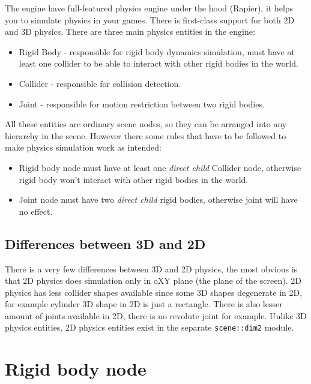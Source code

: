 \documentclass[
]{book}
\providecommand{\tightlist}{%
  \setlength{\itemsep}{0pt}\setlength{\parskip}{0pt}}
\theoremstyle{definition}
\theoremstyle{definition}
\theoremstyle{definition}
\theoremstyle{definition}
\theoremstyle{remark}
\begin{document}
The engine have full-featured physics engine under the hood (Rapier), it helps you to simulate physics in your games.
There is first-class support for both 2D and 3D physics. There are three main physics entities in the engine:

\begin{itemize}
\tightlist
\item
  Rigid Body - responsible for rigid body dynamics simulation, must have at least one collider to be able to interact with other rigid bodies in the world.
\item
  Collider - responsible for collision detection.
\item
  Joint - responsible for motion restriction between two rigid bodies.
\end{itemize}

All these entities are ordinary scene nodes, so they can be arranged into any hierarchy in the scene. However there some rules that have to be followed to make physics simulation work as intended:

\begin{itemize}
\tightlist
\item
  Rigid body node must have at least one \emph{direct child} Collider node, otherwise rigid body won't interact with other rigid bodies in the world.
\item
  Joint node must have two \emph{direct child} rigid bodies, otherwise joint will have no effect.
\end{itemize}

\subsection{Differences between 3D and 2D}\label{differences-between-3d-and-2d}

There is a very few differences between 3D and 2D physics, the most obvious is that 2D physics does simulation only in oXY plane (the plane of the screen). 2D physics has less collider shapes available since some 3D shapes degenerate in 2D, for example cylinder 3D shape in 2D is just a rectangle. There is also lesser amount of joints available in 2D, there is no revolute joint for example. Unlike 3D physics entities, 2D physics entities exist in the separate \texttt{scene::dim2} module.

\section{Rigid body node}\label{rigid-body-node}
\end{document}
